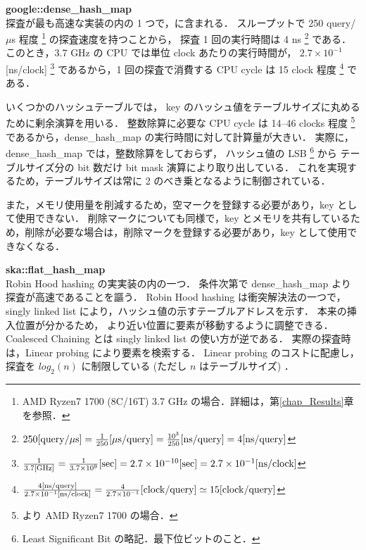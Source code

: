 {\bf google::dense\_hash\_map}
\samepage \\ \indent
探査が最も高速な実装の内の 1 つで，\cite{sparsehash2005}に含まれる．
スループットで 250 query/$\mu$s 程度
\footnote{AMD Ryzen7 1700 (8C/16T) 3.7 GHz の場合．詳細は，第\ref{chap_Results}章を参照．}
の探査速度を持つことから，
探査 1 回の実行時間は 4 ns
\footnote{
  $
    250{\rm [query \slash \mu s]}
    = \frac{1}{250} {\rm [\mu s \slash query]}
    = \frac{10^3}{250} {\rm [ns \slash query]}
    = 4 {\rm [ns \slash query]}
  $
}
である．このとき，3.7 GHz の CPU では単位 clock あたりの実行時間が，
$2.7 \times 10^{-1}$ [ns/clock]
\footnote{
  $
    \frac{1}{3.7 {\rm [GHz]}}
    = \frac{1}{3.7 \times 10^9}{\rm [sec]}
    = 2.7 \times 10^{-10}{\rm [sec]}
    = 2.7 \times 10^{-1}{\rm [ns/clock]}
  $
}
であるから，1 回の探査で消費する CPU cycle は
15 clock 程度
\footnote{
  $
    \frac{ 4 {\rm [ns/query]} }{ 2.7 \times 10^{-1} {\rm [ns/clock]} }
    = \frac{ 4 }{ 2.7 \times 10^{-1} } {\rm [clock/query]}
    \simeq 15 {\rm [clock/query]}
  $
}
である．

いくつかのハッシュテーブルでは，
key のハッシュ値をテーブルサイズに丸めるために剰余演算を用いる．
整数除算に必要な CPU cycle は 14--46 clocks 程度
\footnote{
  \cite{AgnerFog2018}より AMD Ryzen7 1700 の場合．
}
であるから，dense\_hash\_map の実行時間に対して計算量が大きい．
実際に，
dense\_hash\_map では，整数除算をしておらず，
ハッシュ値の LSB \footnote{Least Significant Bit の略記．最下位ビットのこと．} から
テーブルサイズ分の bit 数だけ bit mask 演算により取り出している．
これを実現するため，テーブルサイズは常に 2 のべき乗となるように制御されている．

また，メモリ使用量を削減するため，空マークを登録する必要があり，key として使用できない．
削除マークについても同様で，key とメモリを共有しているため，削除が必要な場合は，削除マークを登録する必要があり，key として使用できなくなる．

{\bf ska::flat\_hash\_map}
\samepage \\ \indent
Robin Hood hashing の実実装の内の一つ．
条件次第で dense\_hash\_map より探査が高速であることを謳う．
Robin Hood hashing は衝突解決法の一つで，
singly linked list により，ハッシュ値の示すテーブルアドレスを示す．
本来の挿入位置が分かるため，
より近い位置に要素が移動するように調整できる．
Coalesced Chaining とは singly linked list の使い方が逆である．
実際の探査時は，Linear probing により要素を検索する．
Linear probing のコストに配慮し，
探査を $log_2(n)$ に制限している (ただし $n$ はテーブルサイズ) \citep{Skarupke2017}．


